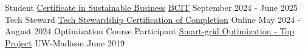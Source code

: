 \begin{cventries}
    \cventry
        {Student}
        {\href{https://www.bcit.ca/programs/sustainable-business-leadership-advanced-diploma-full-time-5180advdip/}{Certificate in Sustainable Business}}
        {\href{https://www.bcit.ca/}{BCIT}}
        {September 2024 - June 2025}
        {
        }
    \cventry
        {Tech Steward}
        {\href{https://credentials.techstewardship.com/en/verify/31639310373308}{Tech Stewardship Certification of Completion}}
        {Online}
        {May 2024 - August 2024}
        {
        }
    \cventry
        {Optimization Course Participant}
        {\href{https://github.com/bryanluu/smartgrid}{Smart-grid Optimization - Top Project}}
        {UW-Madison}
        {June 2019}
        {}
\end{cventries}